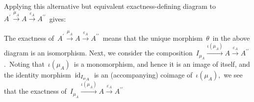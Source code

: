 \begin{enumerate}
\begin{center}
	\end{center}
	Applying this alternative but equivalent exactness-defining diagram to 
	\,$A^{\prime} \overset{\mu_{A}}{\longrightarrow} A \overset{\varepsilon_{A}}{\longrightarrow} A^{\prime\prime}$\,
	gives:	
	\begin{center}
	\end{center}
	The exactness of
	\,$A^{\prime} \overset{\mu_{A}}{\longrightarrow} A \overset{\varepsilon_{A}}{\longrightarrow} A^{\prime\prime}$\,
	means that the unique morphism \,$\theta$\, in the above diagram is an isomorphism.
	Next, we consider the composition
	\,$I_{\mu_{A}} \overset{\iota(\mu_{A})}{\longrightarrow} A \overset{\varepsilon_{A}}{\longrightarrow} A^{\prime\prime}$.\,
	Noting that \,$\iota(\mu_{A})$\, is a monomorphism, and hence it is an image of itself,
	and the identity morphism \,$\textnormal{id}_{I_{\mu_{A}}}$\, is an (accompanying) coimage of \,$\iota(\mu_{A})$,\,
	we see that the exactness of
	\,$I_{\mu_{A}} \overset{\iota(\mu_{A})}{\longrightarrow} A \overset{\varepsilon_{A}}{\longrightarrow} A^{\prime\prime}$\,

\end{enumerate}
